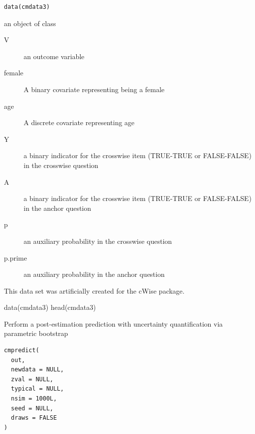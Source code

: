 \documentclass[a4paper]{book}
\begin{document}
%
\begin{Usage}
\begin{verbatim}
data(cmdata3)
\end{verbatim}
\end{Usage}
%
\begin{Format}
an object of class 
\begin{description}

\item[V] an outcome variable
\item[female] A binary covariate representing being a female
\item[age] A discrete covariate representing age
\item[Y] a binary indicator for the crosswise item (TRUE-TRUE or FALSE-FALSE) in the crosswise question
\item[A] a binary indicator for the crosswise item (TRUE-TRUE or FALSE-FALSE) in the anchor question
\item[p] an auxiliary probability in the crosswise question
\item[p.prime] an auxiliary probability in the anchor question

\end{description}

\end{Format}
%
\begin{References}
This data set was artificially created for the cWise package.
\end{References}
%
\begin{Examples}
\begin{ExampleCode}

data(cmdata3)
head(cmdata3)

\end{ExampleCode}
\end{Examples}
%
\begin{Description}
Perform a post-estimation prediction with uncertainty quantification via parametric bootstrap
\end{Description}
%
\begin{Usage}
\begin{verbatim}
cmpredict(
  out,
  newdata = NULL,
  zval = NULL,
  typical = NULL,
  nsim = 1000L,
  seed = NULL,
  draws = FALSE
)
\end{verbatim}
\end{Usage}
%
\end{document}
